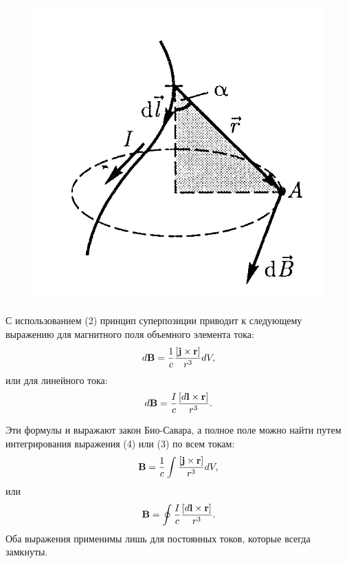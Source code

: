 \documentclass[12pt,a4paper]{article}
\begin{document}
\begin{figure}
    \centering
    \includegraphics[width=\linewidth]{pics/BSL.png}
\end{figure}
С использованием (2) принцип суперпозиции приводит к следующему выражению для магнитного поля объемного элемента тока:
\begin{equation}
    d\textbf{B} = {1 \over c} {[\textbf{j} \times \textbf{r}] \over r^3} dV,
\end{equation}
или для линейного тока:
\begin{equation}
    d\textbf{B} = {I \over c} {[d\textbf{l} \times \textbf{r}] \over r^3}.
\end{equation}

Эти формулы и выражают закон Био-Савара, а полное поле можно найти путем интегрирования выражения (4) или (3) по всем токам:
\begin{equation}
    \textbf{B} = {1 \over c}\int {[\textbf{j} \times \textbf{r}] \over r^3} dV,
\end{equation}
или 
\begin{equation}
    \textbf{B} = \oint {I \over c}{[d\textbf{l} \times \textbf{r}] \over r^3}.
\end{equation}
Оба выражения применимы лишь для постоянных токов, которые всегда замкнуты.
\end{document}
